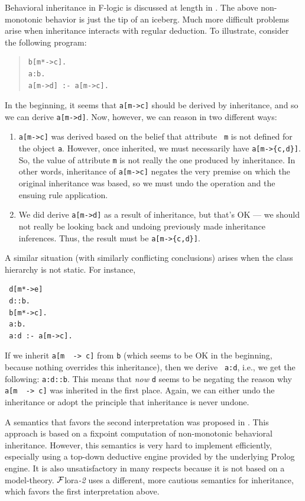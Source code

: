 \documentclass[11pt]{article}
\newcommand{\mvd}{{\mbox{\tt \,->\,}}}  %
\newcommand{\FLORA}{{\mbox{\sc ${\cal F}${lora}\rm\emph{-2}}}\xspace}
\newcommand{\fl}{\mbox{F-logic}\xspace}
\begin{document}
Behavioral inheritance in \fl is discussed at length in
\cite{inheritance-odbase-02,kifer-yang-inheritance-2006}.  The above  non-monotonic behavior is
just the tip of an iceberg. Much more difficult problems arise when
inheritance interacts with regular deduction. To illustrate, consider
the following program:
\begin{quote}
\begin{verbatim}
b[m*->c].
a:b.
a[m->d] :- a[m->c].
\end{verbatim}
\end{quote}
In the beginning, it seems that \verb|a[m->c]| should be derived by
inheritance, and so we can derive \verb|a[m->d]|. Now, however, we can
reason in two different ways:
\begin{enumerate}
\item \verb|a[m->c]| was derived based on the belief that attribute {\tt
    m} is not defined for the object {\tt a}. However, once inherited,
  we must necessarily have \verb|a[m->{c,d}]|. So, the value of
  attribute {\tt m} is not really the one produced by inheritance. In other
  words, inheritance of \verb|a[m->c]| negates the very premise on which
  the original inheritance was based, so we must undo the operation and the
  ensuing rule application.
\item We did derive \verb|a[m->d]| as a result of inheritance, but
  that's OK --- we should not really be looking back and undoing previously
  made inheritance inferences. Thus, the result must be \verb|a[m->{c,d}]|.
\end{enumerate}
A similar situation (with similarly conflicting conclusions) arises when
the class hierarchy is not static. For instance, 
\begin{verbatim}
 d[m*->e]
 d::b.
 b[m*->c].
 a:b.
 a:d :- a[m->c].  
\end{verbatim}
If we inherit {\tt a[m \mvd c]}  from {\tt b} (which seems to be OK in the
beginning, because nothing overrides this inheritance), then we derive {\tt
  a:d}, i.e., we get the following: {\tt a:d::b}. This means that
\emph{now} {\tt d} seems to be negating the reason why {\tt a[m \mvd c]} was
inherited in the first place. Again, we can either undo the inheritance or
adopt the principle that inheritance is never undone.

A semantics that favors the second interpretation was proposed in
\cite{KLW95}. This approach is based on a fixpoint computation of
non-monotonic behavioral inheritance.  However, this semantics is very hard
to implement efficiently, especially using a top-down deductive engine
provided by the underlying Prolog engine. It is also unsatisfactory in many
respects because it is not based on a model-theory. \FLORA uses a
different, more cautious semantics for inheritance, which favors the first
interpretation above.
\end{document}

